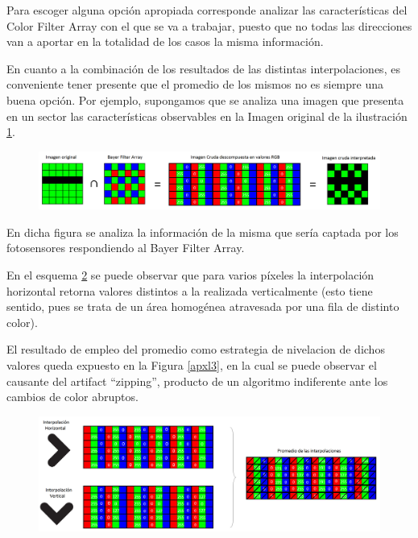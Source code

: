 \documentclass[a4paper]{article}
\begin{document}
Para escoger alguna opción apropiada corresponde analizar las características del Color Filter Array con el que se va a trabajar, puesto que no todas las direcciones van a aportar en la totalidad de los casos la misma información.

En cuanto a la combinación de los resultados de las distintas interpolaciones, es conveniente tener presente que el promedio de los mismos no es siempre una buena opción. Por ejemplo, supongamos que se analiza una imagen que presenta en un sector las características observables en la Imagen original de la ilustración \ref{apxl1}.


\begin{figure}[h!]
	\caption{}
	\begin{center}
	\includegraphics[scale=0.23]{imagenes/apxl1}
	\label{apxl1}
  \end{center}
\end{figure}

En dicha figura se analiza la información de la misma que sería captada por los fotosensores respondiendo al Bayer Filter Array. 

En el esquema \ref{apxl2} se puede observar que para varios p\'ixeles la interpolación horizontal retorna valores distintos a la realizada verticalmente (esto tiene sentido, pues se trata de un área homogénea atravesada por una fila de distinto color).

El resultado de empleo del promedio como estrategia de nivelacion de dichos valores queda expuesto en la Figura \ref{apxl3}, en la cual se puede observar el causante del artifact ``zipping'', producto de un algoritmo indiferente ante los cambios de color abruptos.\\

\begin{figure}[h!]
	\caption{}
	\begin{center}
\includegraphics[scale=0.26]{imagenes/apxl2}
	\label{apxl2}
  \end{center}
\end{figure}
\end{document}
